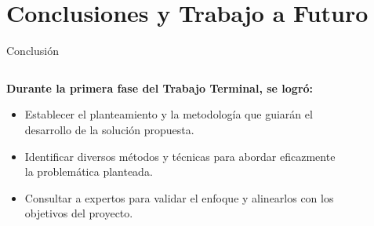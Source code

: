\section[Conclusiones]{Conclusiones y Trabajo a Futuro}
\begin{frame}{Conclusión}
    \begin{columns}
        \begin{column}{0.6\textwidth}
            \textbf{Durante la primera fase del Trabajo Terminal, se logró:}
            \begin{itemize}
                \item Establecer el planteamiento y la metodología que guiarán el desarrollo de la solución propuesta.
                \item Identificar diversos métodos y técnicas para abordar eficazmente la problemática planteada.
                \item Consultar a expertos para validar el enfoque y alinearlos con los objetivos del proyecto.
            \end{itemize}
        \end{column}
        \begin{column}{0.4\textwidth}
            \centering
            \begin{figure}[H]
                \centering
\end{figure}
\end{column}
\end{columns}
\end{frame}
